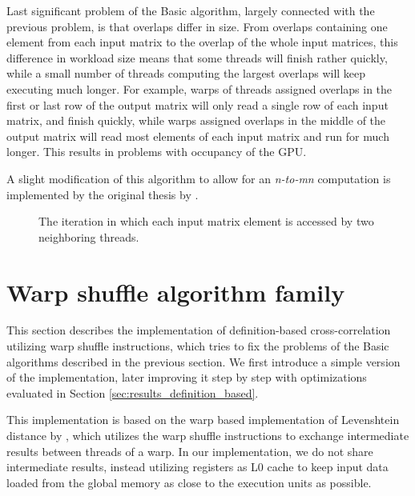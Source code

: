 Last significant problem of the Basic algorithm, largely connected with the previous problem, is that overlaps differ in size. From overlaps containing one element from each input matrix to the overlap of the whole input matrices, this difference in workload size means that some threads will finish rather quickly, while a small number of threads computing the largest overlaps will keep executing much longer. For example, warps of threads assigned overlaps in the first or last row of the output matrix will only read a single row of each input matrix, and finish quickly, while warps assigned overlaps in the middle of the output matrix will read most elements of each input matrix and run for much longer. This results in problems with occupancy of the GPU.
  
  
A slight modification of this algorithm to allow for an \textit{n-to-mn} computation is implemented by the original thesis by \citet{misko}.



\begin{figure}[ht]
	\centering
	\def\svgwidth{0.5\textwidth}
	\fontsize{8}{10}\selectfont
	
	\caption{The iteration in which each input matrix element is accessed by two neighboring threads.}
	\label{fig:warp_shuffle_shuffle}
\end{figure}



\section{Warp shuffle algorithm family}
\label{sec:warp_shuffle_alg}

This section describes the implementation of definition-based cross-correlation utilizing warp shuffle instructions, which tries to fix the problems of the Basic algorithms described in the previous section. We first introduce a simple version of the implementation, later improving it step by step with optimizations evaluated in Section \ref{sec:results_definition_based}.

This implementation is based on the warp based implementation of Levenshtein distance by \citet{paper:levenstein}, which utilizes the warp shuffle instructions to exchange intermediate results between threads of a warp. In our implementation, we do not share intermediate results, instead utilizing registers as L0 cache to keep input data loaded from the global memory as close to the execution units as possible. 



